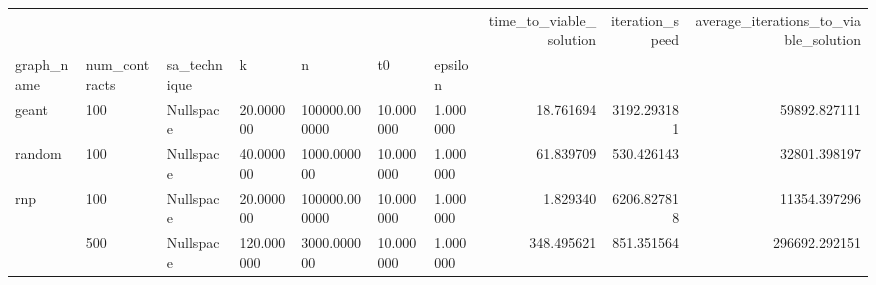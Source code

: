 \begin{tabular}{lllllllrrr}
\toprule
 &  &  &  &  &  &  & time_to_viable_solution & iteration_speed & average_iterations_to_viable_solution \\
graph_name & num_contracts & sa_technique & k & n & t0 & epsilon &  &  &  \\
\midrule
geant & 100 & Nullspace & 20.000000 & 100000.000000 & 10.000000 & 1.000000 & 18.761694 & 3192.293181 & 59892.827111 \\
\cline{1-10} \cline{2-10} \cline{3-10} \cline{4-10} \cline{5-10} \cline{6-10}
random & 100 & Nullspace & 40.000000 & 1000.000000 & 10.000000 & 1.000000 & 61.839709 & 530.426143 & 32801.398197 \\
\cline{1-10} \cline{2-10} \cline{3-10} \cline{4-10} \cline{5-10} \cline{6-10}
\multirow[t]{2}{*}{rnp} & 100 & Nullspace & 20.000000 & 100000.000000 & 10.000000 & 1.000000 & 1.829340 & 6206.827818 & 11354.397296 \\
\cline{2-10} \cline{3-10} \cline{4-10} \cline{5-10} \cline{6-10}
 & 500 & Nullspace & 120.000000 & 3000.000000 & 10.000000 & 1.000000 & 348.495621 & 851.351564 & 296692.292151 \\
\cline{1-10} \cline{2-10} \cline{3-10} \cline{4-10} \cline{5-10} \cline{6-10}
\bottomrule
\end{tabular}
